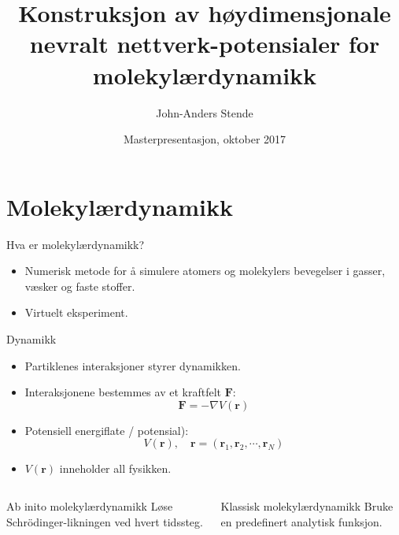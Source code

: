 \documentclass{beamer}
\title{Konstruksjon av høydimensjonale nevralt nettverk-potensialer for molekylærdynamikk}
\author{John-Anders Stende}
\institute{
  Fysisk institutt \\
  Universitetet i Oslo
}
\date{Masterpresentasjon, oktober 2017}
\begin{document}
\frame{\titlepage}

\section{Molekylærdynamikk}

\begin{frame}

\begin{block}{Hva er molekylærdynamikk?}
  \begin{itemize}
  \item Numerisk metode for å simulere atomers og molekylers bevegelser i gasser, væsker og faste stoffer.
  \item Virtuelt eksperiment.
  \end{itemize}
\end{block}

\end{frame}


\begin{frame}

\begin{block}{Dynamikk}
  \begin{itemize}
  \item Partiklenes interaksjoner styrer dynamikken.
  \item Interaksjonene bestemmes av et kraftfelt $\mathbf{F}$:
    \begin{equation*}
    \mathbf{F} = -\nabla V(\mathbf{r})
    \end{equation*}
  \item Potensiell energiflate / potensial):
    \begin{equation*}
      V(\mathbf{r}), \quad \mathbf{r} = (\mathbf{r}_1, \mathbf{r}_2, \cdots, \mathbf{r}_N)
    \end{equation*}
  \item $V(\mathbf{r})$ inneholder all fysikken. 
  \end{itemize}
\end{block}

\end{frame}


\begin{frame}

\begin{columns}[T] %
  \begin{column}[T]{0.5\linewidth} %
    \begin{block}{Ab inito molekylærdynamikk}
    Løse Schrödinger-likningen ved hvert tidssteg.
    \end{block}
  \end{column}
  \begin{column}[T]{0.5\linewidth} %
    \begin{block}{Klassisk molekylærdynamikk}
    Bruke en predefinert analytisk funksjon.
    \end{block}
  \end{column}
\end{columns}

\end{frame}
\end{document}
